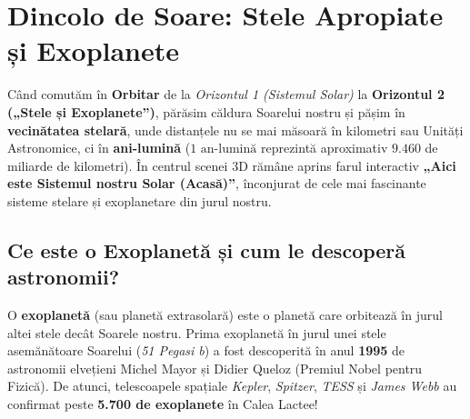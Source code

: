 \chapter{Dincolo de Soare: Stele Apropiate și Exoplanete}
\label{chap:exoplanete}

Când comutăm în \textbf{Orbitar} de la \emph{Orizontul 1 (Sistemul Solar)} la \textbf{Orizontul 2 („Stele și Exoplanete”)}, părăsim căldura Soarelui nostru și pășim în \textbf{vecinătatea stelară}, unde distanțele nu se mai măsoară în kilometri sau Unități Astronomice, ci în \textbf{ani-lumină} ($1\text{ an-lumină}$ reprezintă aproximativ $9.460$ de miliarde de kilometri). În centrul scenei 3D rămâne aprins farul interactiv \textbf{„Aici este Sistemul nostru Solar (Acasă)”}, înconjurat de cele mai fascinante sisteme stelare și exoplanetare din jurul nostru.

\section*{Ce este o Exoplanetă și cum le descoperă astronomii?}

O \textbf{exoplanetă} (sau planetă extrasolară) este o planetă care orbitează în jurul altei stele decât Soarele nostru. Prima exoplanetă în jurul unei stele asemănătoare Soarelui (\emph{51 Pegasi b}) a fost descoperită în anul \textbf{1995} de astronomii elvețieni Michel Mayor și Didier Queloz (Premiul Nobel pentru Fizică). De atunci, telescoapele spațiale \emph{Kepler}, \emph{Spitzer}, \emph{TESS} și \emph{James Webb} au confirmat peste \textbf{5.700 de exoplanete} în Calea Lactee!

